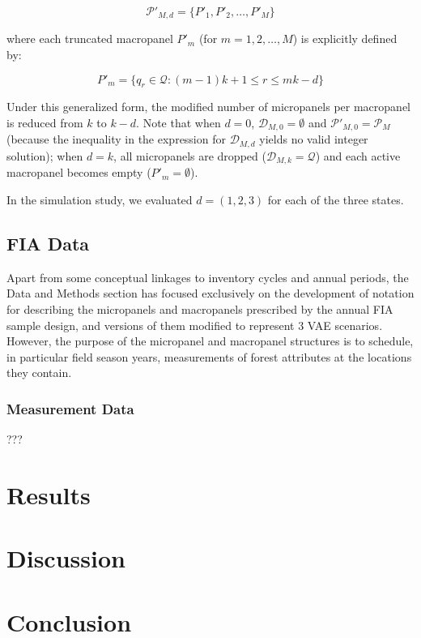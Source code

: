 \documentclass[
  number]{elsarticle}
\begin{document}
\[\mathcal{P}'_{M,d} = \{P'_1, P'_2, \dots, P'_M\}\]

where each truncated macropanel \(P'_m\) (for \(m = 1, 2, \dots, M\)) is
explicitly defined by:

\[P'_m = \{ q_r \in \mathcal{Q} : (m-1)k + 1 \leq r \leq mk - d \}\]

Under this generalized form, the modified number of micropanels per
macropanel is reduced from \(k\) to \(k - d\). Note that when \(d = 0\),
\(\mathcal{D}_{M,0} = \emptyset\) and
\(\mathcal{P}'_{M,0} = \mathcal{P}_M\) (because the inequality in the
expression for \(\mathcal{D}_{M,d}\) yields no valid integer solution);
when \(d = k\), all micropanels are dropped
(\(\mathcal{D}_{M,k} = \mathcal{Q}\)) and each active macropanel becomes
empty (\(P'_m = \emptyset\)).

In the simulation study, we evaluated \(d = (1,2,3)\) for each of the
three states.

\subsection{FIA Data}\label{fia-data}

Apart from some conceptual linkages to inventory cycles and annual
periods, the Data and Methods section has focused exclusively on the
development of notation for describing the micropanels and macropanels
prescribed by the annual FIA sample design, and versions of them
modified to represent 3 VAE scenarios. However, the purpose of the
micropanel and macropanel structures is to schedule, in particular field
season years, measurements of forest attributes at the locations they
contain.

\subsubsection{Measurement Data}\label{measurement-data}

???

\section{Results}\label{sec-results}

\section{Discussion}\label{sec-discussion}

\section{Conclusion}\label{sec-conclusion}
\end{document}
